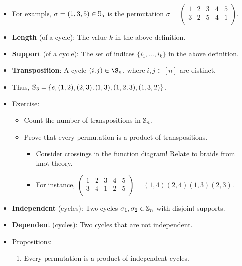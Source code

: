 \documentclass[../apprentice.tex]{subfiles}
\begin{document}
\begin{itemize}
    \item For example, $\sigma=(1,3,5)\in\mathbb{S}_5$ is the permutation $
        \sigma=\left(
            \begin{smallmatrix}
                1 & 2 & 3 & 4 & 5\\
                3 & 2 & 5 & 4 & 1\\
            \end{smallmatrix}
        \right)
    $.
    \item \textbf{Length} (of a cycle): The value $k$ in the above definition.
    \item \textbf{Support} (of a cycle): The set of indices $\{i_1,\dots,i_k\}$ in the above definition.
    \item \textbf{Transposition}: A cycle $(i,j)\in\S_n$, where $i,j\in[n]$ are distinct.
    \item Thus, $\mathbb{S}_3=\{e,(1,2),(2,3),(1,3),(1,2,3),(1,3,2)\}$.
    \item Exercise:
    \begin{itemize}
        \item Count the number of transpositions in $\mathbb{S}_n$.
        \item Prove that every permutation is a product of transpositions.
        \begin{itemize}
            \item Consider crossings in the function diagram! Relate to braids from knot theory.
            \item For instance, $
                \left(
                    \begin{smallmatrix}
                        1 & 2 & 3 & 4 & 5\\
                        3 & 4 & 1 & 2 & 5\\
                    \end{smallmatrix}
                \right)=(1,4)(2,4)(1,3)(2,3)
            $.
        \end{itemize}
    \end{itemize}
    \item \textbf{Independent} (cycles): Two cycles $\sigma_1,\sigma_2\in\mathbb{S}_n$ with disjoint supports.
    \item \textbf{Dependent} (cycles): Two cycles that are not independent.
    \item Propositions:
    \begin{enumerate}
        \item Every permutation is a product of independent cycles.
        \begin{itemize}

\end{itemize}
\end{enumerate}
\end{itemize}
\end{document}

